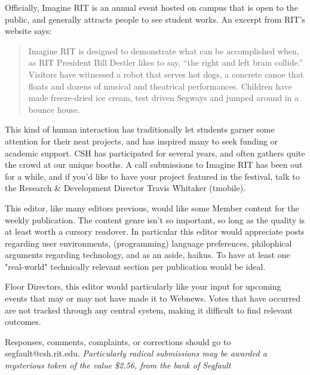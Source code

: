 \documentclass[9pt]{extarticle} %
\begin{document}
\begin{minipage}[t]{.66\linewidth} %
\vspace{-0.4cm}
\hypertarget{firstnews}{}

Officially, Imagine RIT is an annual event hosted on campus that is open to the public, and generally attracts people to see student works. An excerpt from RIT's website says:

\begin{quote}
Imagine RIT is designed to demonstrate what can be accomplished when, as RIT President Bill Destler likes to say, “the right and left brain collide.” Visitors have witnessed a robot that serves hot dogs, a concrete canoe that floats and dozens of musical and theatrical performances. Children have made freeze-dried ice cream, test driven Segways and jumped around in a bounce house.
\end{quote}

This kind of human interaction has traditionally let students garner some attention for their neat projects, and has inspired many to seek funding or academic support. CSH has participated for several years, and often gathers quite the crowd at our unique booths. A call submissions to Imagine RIT has been out for a while, and if you'd like to have your project featured in the festival, talk to the Research \& Development Director Travis Whitaker (tmobile).


\hypertarget{secondnews}{} 

This editor, like many editors previous, would like some Member content for the weekly publication. The content genre isn't so important, so long as the quality is at least worth a cursory readover. In particular this editor would appreciate posts regarding user environments, (programming) language preferences, philophical arguments regarding technology, and as an aside, haikus. To have at least one "real-world" technically relevant section per publication would be ideal.

Floor Directors, this editor would particularly like your input for upcoming events that may or may not have made it to Webnews. Votes that have occurred are not tracked through any central system, making it difficult to find relevant outcomes.

Responses, comments, complaints, or corrections should go to segfault@csh.rit.edu.
\textit{Particularly radical submissions may be awarded a mysterious token of the value \$2.56, from the bank of Segfault}


\end{minipage}
\end{document}
